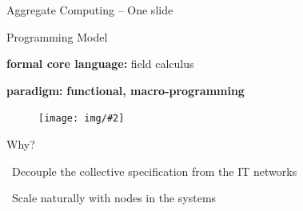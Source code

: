 \documentclass[presentation, 8pt,169]{beamer}\mode<presentation>{\usetheme{AMSBolognaFC}}
\newcommand{\lbl}[1]{\textbf{\textcolor{gray!90!white}{#1}}}
\newcommand{\bo}[1]{\textbf{#1}}
\newcommand{\imgv}[2]{
\begin{figure}
\centering
\texttt{[image: img/\#2]}
\end{figure}
}
\begin{document}
\begin{frame}{Aggregate Computing -- One slide}
{  }{
  \begin{block}{\footnotesize Programming Model}
    \scriptsize
    
    \lbl{formal core language:} field calculus\vspace{0.1cm}
    
    \lbl{paradigm:} \bo{functional, macro-programming} \vspace{0.1cm} %
    
    \centering
    \imgv{0.22}{channel.pdf}
  \end{block}  
    
  \begin{block}{\footnotesize Why?}
    \scriptsize
    
    {\bold{\faThumbsUp}} \, Decouple the collective specification from the IT networks  \vspace{0.1cm}
    
    {\bold{\faThumbsUp}} \, Scale naturally with nodes in the systems  \vspace{0.1cm}
     
    
  \end{block}
  

  }
  
\end{frame}
\end{document}
